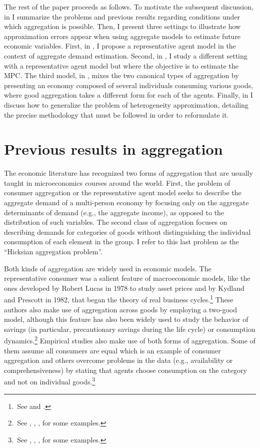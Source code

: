 \documentclass[english, a4paper, 12pt]{article}
\begin{document}
The rest of the paper proceeds as follows. To motivate the subsequent discussion, in  I summarize the problems and previous results regarding conditions under which aggregation is possible. Then, I present three settings to illustrate how approximation errors appear when using aggregate models to estimate future economic variables. First, in , I propose a representative agent model in the context of aggregate demand estimation. Second, in , I study a different setting with a representative agent model but where the objective is to estimate the MPC. The third model, in , mixes the two canonical types of aggregation by presenting an economy composed of several individuals consuming various goods, where good aggregation takes a different form for each of the agents. Finally, in  I discuss how to generalize the problem of heterogeneity approximation, detailing the precise methodology that must be followed in order to reformulate it.

\section{Previous results in aggregation} \label{sec:PrevResults}
The economic literature has recognized two forms of aggregation that are usually taught in microeconomics courses around the world. First, the problem of consumer aggregation or the representative agent model seeks to describe the aggregate demand of a multi-person economy by focusing only on the aggregate determinants of demand (e.g., the aggregate income), as opposed to the distribution of such variables. The second class of aggregation focuses on describing demands for categories of goods without distinguishing the individual consumption of each element in the group. I refer to this last problem as the ``Hicksian aggregation problem''.

Both kinds of aggregation are widely used in economic models. The representative consumer was a salient feature of macroeconomic models, like the ones developed by Robert Lucas in 1978 to study asset prices and by Kydland and Prescott in 1982, that began the theory of real business cycles.\footnote{\,See \cite{Lucas78} and \cite{KyPr82}.} These authors also make use of aggregation across goods by employing a two-good model, although this feature has also been widely used to study the behavior of savings (in particular, precautionary savings during the life cycle) or consumption dynamics.\footnote{\,See \cite{Carroll92}, \cite{GourinchasParker02}, \cite{GulPesendorfer04}, \cite{ParkerPreston05} for some examples.} Empirical studies also make use of both forms of aggregation. Some of them assume all consumers are equal which is an example of consumer aggregation and others overcome problems in the data (e.g., availability or comprehensiveness) by stating that agents choose consumption on the category and not on individual goods.\footnote{\,See \cite{KaplanViolante14}, \cite{BergerVavra15}, \cite{KanPengWang17}, \cite{FagerengGuisoPistaferri17} for some examples.}
\end{document}
